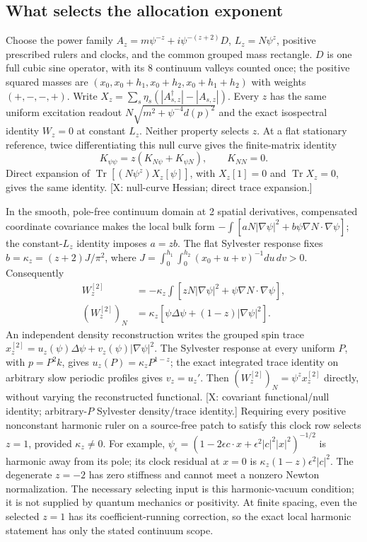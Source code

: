 \subsection*{What selects the allocation exponent}
Choose the power family
$A_z=m\psi^{-z}+i\psi^{-(z+2)}D$,
$L_z=N\psi^z$, positive prescribed rulers and clocks, and the
common grouped mass rectangle.
$D$ is one full cubic sine operator, with its 8 continuum valleys
counted once; the positive squared masses are
$(x_0,x_0+h_1,x_0+h_2,x_0+h_1+h_2)$ with weights $(+,-,-,+)$.
Write $X_z=\sum_s\eta_s(|A_{s,z}^\dagger|-|A_{s,z}|)$.
Every $z$ has the same uniform excitation readout
$N\sqrt{m^2+\psi^{-4}d(p)^2}$ and the exact isospectral identity
$W_z=0$ at constant $L_z$.
Neither property selects $z$.
At a flat stationary reference, twice differentiating this null curve
gives the finite-matrix identity
\[
 K_{\psi\psi}=z(K_{N\psi}+K_{\psi N}),\qquad K_{NN}=0.
\]
Direct expansion of $\operatorname{Tr}[(N\psi^z)X_z[\psi]]$, with
$X_z[1]=0$ and $\operatorname{Tr}X_z=0$, gives the same identity.
[X: null-curve Hessian; direct trace expansion.]

In the smooth, pole-free continuum domain at 2 spatial derivatives,
compensated coordinate covariance makes the local bulk form
$-\int[aN|\nabla\psi|^2+b\psi\nabla N\cdot\nabla\psi]$;
the constant-$L_z$ identity imposes $a=zb$.
The flat Sylvester response fixes
$b=\kappa_z=(z+2)J/\pi^2$, where
$J=\int_0^{h_1}\int_0^{h_2}(x_0+u+v)^{-1}du\,dv>0$.
Consequently
\[
 \begin{aligned}
 W_z^{[2]}&=-\kappa_z\!\int
 [zN|\nabla\psi|^2+\psi\nabla N\cdot\nabla\psi],\\
 (W_z^{[2]})_N&=\kappa_z
 [\psi\Delta\psi+(1-z)|\nabla\psi|^2].
 \end{aligned}
\]
An independent density reconstruction writes the grouped spin trace
$x_z^{[2]}=u_z(\psi)\Delta\psi+v_z(\psi)|\nabla\psi|^2$.
The Sylvester response at every uniform $P$, with $p=P^2k$,
gives $u_z(P)=\kappa_zP^{1-z}$; the exact integrated trace
identity on arbitrary slow periodic profiles gives $v_z=u_z'$.
Then $(W_z^{[2]})_N=\psi^zx_z^{[2]}$ directly, without varying
the reconstructed functional.
[X: covariant functional/null identity; arbitrary-$P$ Sylvester
density/trace identity.]
Requiring every positive nonconstant harmonic ruler on a source-free
patch to satisfy this clock row selects $z=1$, provided
$\kappa_z\ne0$.
For example,
$\psi_\epsilon=(1-2\epsilon c\cdot x+
\epsilon^2|c|^2|x|^2)^{-1/2}$
is harmonic away from its pole; its clock residual at $x=0$ is
$\kappa_z(1-z)\epsilon^2|c|^2$.
The degenerate $z=-2$ has zero stiffness and cannot meet a nonzero
Newton normalization.
The necessary selecting input is this harmonic-vacuum condition;
it is not supplied by quantum mechanics or positivity.
At finite spacing, even the selected $z=1$ has its coefficient-running
correction, so the exact local harmonic statement has only the stated
continuum scope.

